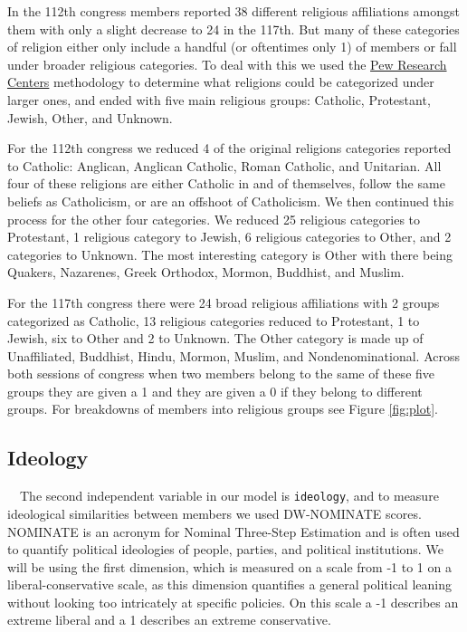 \documentclass[Royal,times,sageh]{sagej}
\begin{document}
In the 112th congress members reported 38 different religious
affiliations amongst them with only a slight decrease to 24 in the
117th. But many of these categories of religion either only include a
handful (or oftentimes only 1) of members or fall under broader
religious categories. To deal with this we used the
\href{https://www.pewresearch.org/religion/2021/01/04/faith-on-the-hill-2021/}{Pew
Research Centers} methodology to determine what religions could be
categorized under larger ones, and ended with five main religious
groups: Catholic, Protestant, Jewish, Other, and Unknown.

For the 112th congress we reduced 4 of the original religions categories
reported to Catholic: Anglican, Anglican Catholic, Roman Catholic, and
Unitarian. All four of these religions are either Catholic in and of
themselves, follow the same beliefs as Catholicism, or are an offshoot
of Catholicism. We then continued this process for the other four
categories. We reduced 25 religious categories to Protestant, 1
religious category to Jewish, 6 religious categories to Other, and 2
categories to Unknown. The most interesting category is Other with there
being Quakers, Nazarenes, Greek Orthodox, Mormon, Buddhist, and Muslim.

For the 117th congress there were 24 broad religious affiliations with 2
groups categorized as Catholic, 13 religious categories reduced to
Protestant, 1 to Jewish, six to Other and 2 to Unknown. The Other
category is made up of Unaffiliated, Buddhist, Hindu, Mormon, Muslim,
and Nondenominational. Across both sessions of congress when two members
belong to the same of these five groups they are given a 1 and they are
given a 0 if they belong to different groups. For breakdowns of members
into religious groups see Figure \ref{fig:plot}.

\hypertarget{ideology}{%
\subsection{Ideology}\label{ideology}}

\doublespacing

~~The second independent variable in our model is \texttt{ideology}, and
to measure ideological similarities between members we used DW-NOMINATE
scores. NOMINATE is an acronym for Nominal Three-Step Estimation and is
often used to quantify political ideologies of people, parties, and
political institutions. We will be using the first dimension, which is
measured on a scale from -1 to 1 on a liberal-conservative scale, as
this dimension quantifies a general political leaning without looking
too intricately at specific policies. On this scale a -1 describes an
extreme liberal and a 1 describes an extreme conservative.
\end{document}
